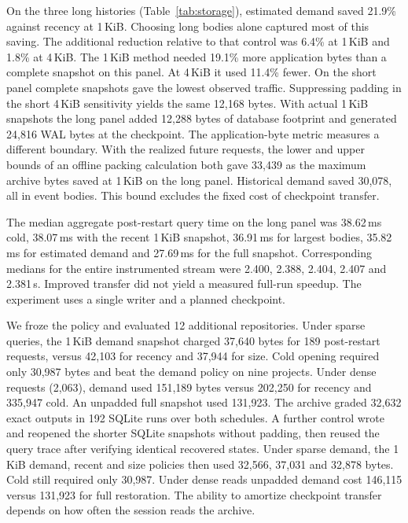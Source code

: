 \documentclass[conference]{IEEEtran}
\begin{document}
On the three long histories (Table~\ref{tab:storage}), estimated demand saved 21.9\% against recency at 1\,KiB. Choosing long bodies alone captured most of this saving. The additional reduction relative to that control was 6.4\% at 1\,KiB and 1.8\% at 4\,KiB. The 1\,KiB method needed 19.1\% more application bytes than a complete snapshot on this panel. At 4\,KiB it used 11.4\% fewer. On the short panel complete snapshots gave the lowest observed traffic. Suppressing padding in the short 4\,KiB sensitivity yields the same 12,168 bytes. With actual 1\,KiB snapshots the long panel added 12,288 bytes of database footprint and generated 24,816 WAL bytes at the checkpoint. The application-byte metric measures a different boundary. With the realized future requests, the lower and upper bounds of an offline packing calculation both gave 33,439 as the maximum archive bytes saved at 1\,KiB on the long panel. Historical demand saved 30,078, all in event bodies. This bound excludes the fixed cost of checkpoint transfer.

The median aggregate post-restart query time on the long panel was 38.62\,ms cold, 38.07\,ms with the recent 1\,KiB snapshot, 36.91\,ms for largest bodies, 35.82\,ms for estimated demand and 27.69\,ms for the full snapshot. Corresponding medians for the entire instrumented stream were 2.400, 2.388, 2.404, 2.407 and 2.381\,s. Improved transfer did not yield a measured full-run speedup. The experiment uses a single writer and a planned checkpoint.

We froze the policy and evaluated 12 additional repositories. Under sparse queries, the 1\,KiB demand snapshot charged 37,640 bytes for 189 post-restart requests, versus 42,103 for recency and 37,944 for size. Cold opening required only 30,987 bytes and beat the demand policy on nine projects. Under dense requests (2,063), demand used 151,189 bytes versus 202,250 for recency and 335,947 cold. An unpadded full snapshot used 131,923. The archive graded 32,632 exact outputs in 192 SQLite runs over both schedules. A further control wrote and reopened the shorter SQLite snapshots without padding, then reused the query trace after verifying identical recovered states. Under sparse demand, the 1\,KiB demand, recent and size policies then used 32,566, 37,031 and 32,878 bytes. Cold still required only 30,987. Under dense reads unpadded demand cost 146,115 versus 131,923 for full restoration. The ability to amortize checkpoint transfer depends on how often the session reads the archive.

\balance
\end{document}
